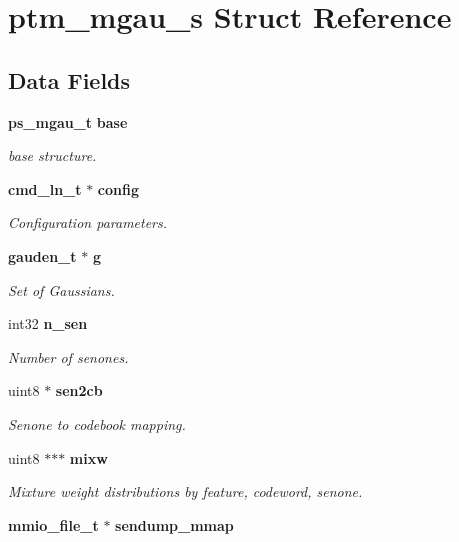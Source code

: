\section{ptm\-\_\-mgau\-\_\-s Struct Reference}
\label{structptm__mgau__s}
\subsection*{Data Fields}
\begin{DoxyCompactItemize}
\item 
{\bf ps\-\_\-mgau\-\_\-t} {\bf base}
\begin{DoxyCompactList}\small\item\em base structure. \end{DoxyCompactList}\item 
{\bf cmd\-\_\-ln\-\_\-t} $\ast$ {\bf config}\label{structptm__mgau__s_aa9cd83ce89052bd6d112ecff54d118f9}

\begin{DoxyCompactList}\small\item\em Configuration parameters. \end{DoxyCompactList}\item 
{\bf gauden\-\_\-t} $\ast$ {\bf g}
\begin{DoxyCompactList}\small\item\em Set of Gaussians. \end{DoxyCompactList}\item 
int32 {\bf n\-\_\-sen}
\begin{DoxyCompactList}\small\item\em Number of senones. \end{DoxyCompactList}\item 
uint8 $\ast$ {\bf sen2cb}
\begin{DoxyCompactList}\small\item\em Senone to codebook mapping. \end{DoxyCompactList}\item 
uint8 $\ast$$\ast$$\ast$ {\bf mixw}\label{structptm__mgau__s_af0898f6d5b5b863901a4a4858a10d32a}

\begin{DoxyCompactList}\small\item\em Mixture weight distributions by feature, codeword, senone. \end{DoxyCompactList}\item 
{\bf mmio\-\_\-file\-\_\-t} $\ast$ {\bfseries sendump\-\_\-mmap}\label{structptm__mgau__s_a51e0c21f32dd4b13a3fcce320c71e375}


\end{DoxyCompactItemize}
